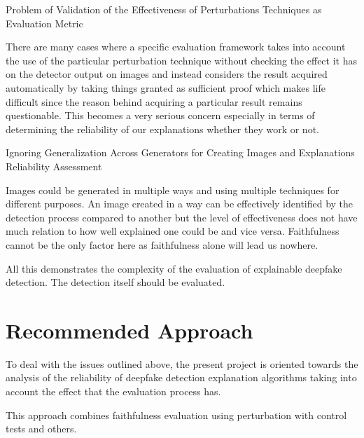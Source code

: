 \documentclass[12pt,a4wide]{report}
\theoremstyle{plain}
\theoremstyle{definition}
\theoremstyle{remark}
\begin{document}
Problem of Validation of the Effectiveness of Perturbations Techniques as Evaluation Metric

There are many cases where a specific evaluation framework takes into account the use of the particular perturbation technique without checking the effect it has on the detector output on images and instead considers the result acquired automatically by taking things granted as sufficient proof which makes life difficult since the reason behind acquiring a particular result remains questionable. This becomes a very serious concern especially in terms of determining the reliability of our explanations whether they work or not.

Ignoring Generalization Across Generators for Creating Images and Explanations Reliability Assessment

Images could be generated in multiple ways and using multiple techniques for different purposes. An image created in a way can be effectively identified by the detection process compared to another but the level of effectiveness does not have much relation to how well explained one could be and vice versa. Faithfulness cannot be the only factor here as faithfulness alone will lead us nowhere.


All this demonstrates the complexity of the evaluation of explainable deepfake detection. The detection itself should be evaluated.


\section{Recommended Approach}
\label{sec:objectives}

To deal with the issues outlined above, the present project is oriented towards the analysis of the reliability of deepfake detection explanation algorithms taking into account the effect that the evaluation process has.

This approach combines faithfulness evaluation using perturbation with control tests and others.
\end{document}
